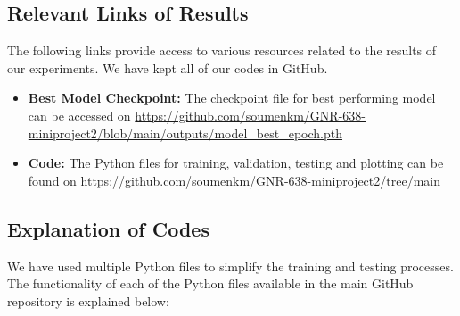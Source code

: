 \documentclass[12pt, a4paper, twoside]{article}
\begin{document}
		\subsection{Relevant Links of Results}
			The following links provide access to various resources related to the results of our experiments. We have kept all of our codes in GitHub.
			
			\begin{itemize}
				\item \textbf{Best Model Checkpoint:} The checkpoint file for best performing model can be accessed on \url{https://github.com/soumenkm/GNR-638-miniproject2/blob/main/outputs/model_best_epoch.pth}
				
				\item \textbf{Code:} The Python files for training, validation, testing and plotting can be found on \url{https://github.com/soumenkm/GNR-638-miniproject2/tree/main}
			\end{itemize}
				
		\subsection{Explanation of Codes}
		We have used multiple Python files to simplify the training and testing processes. The functionality of each of the Python files available in the main GitHub repository is explained below:
		
\end{document}
